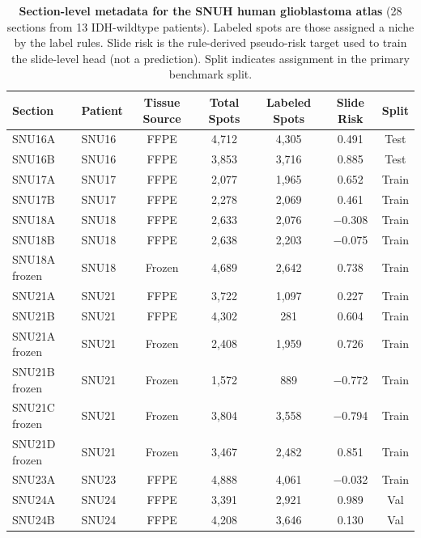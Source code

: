 \documentclass[11pt,letterpaper]{article}
\begin{document}
\clearpage

\begin{table}[H]
\centering
\caption{\textbf{Section-level metadata for the SNUH human glioblastoma atlas} (28 sections from 13 IDH-wildtype patients). Labeled spots are those assigned a niche by the label rules. Slide risk is the rule-derived pseudo-risk target used to train the slide-level head (not a prediction). Split indicates assignment in the primary benchmark split.}
\label{tab:s2}
\footnotesize
\setlength{\tabcolsep}{4.5pt}
\begin{tabular}{llccccc}
\toprule
\textbf{Section} & \textbf{Patient} & \textbf{Tissue Source} & \textbf{Total Spots} & \textbf{Labeled Spots} & \textbf{Slide Risk} & \textbf{Split} \\
\midrule
SNU16A         & SNU16   & FFPE   & 4{,}712 & 4{,}305 & 0.491  & Test \\
SNU16B         & SNU16   & FFPE   & 3{,}853 & 3{,}716 & 0.885  & Test \\
SNU17A         & SNU17   & FFPE   & 2{,}077 & 1{,}965 & 0.652  & Train \\
SNU17B         & SNU17   & FFPE   & 2{,}278 & 2{,}069 & 0.461  & Train \\
SNU18A         & SNU18   & FFPE   & 2{,}633 & 2{,}076 & $-$0.308 & Train \\
SNU18B         & SNU18   & FFPE   & 2{,}638 & 2{,}203 & $-$0.075 & Train \\
SNU18A frozen  & SNU18   & Frozen & 4{,}689 & 2{,}642 & 0.738  & Train \\
SNU21A         & SNU21   & FFPE   & 3{,}722 & 1{,}097 & 0.227  & Train \\
SNU21B         & SNU21   & FFPE   & 4{,}302 & 281     & 0.604  & Train \\
SNU21A frozen  & SNU21   & Frozen & 2{,}408 & 1{,}959 & 0.726  & Train \\
SNU21B frozen  & SNU21   & Frozen & 1{,}572 & 889     & $-$0.772 & Train \\
SNU21C frozen  & SNU21   & Frozen & 3{,}804 & 3{,}558 & $-$0.794 & Train \\
SNU21D frozen  & SNU21   & Frozen & 3{,}467 & 2{,}482 & 0.851  & Train \\
SNU23A         & SNU23   & FFPE   & 4{,}888 & 4{,}061 & $-$0.032 & Train \\
SNU24A         & SNU24   & FFPE   & 3{,}391 & 2{,}921 & 0.989  & Val \\
SNU24B         & SNU24   & FFPE   & 4{,}208 & 3{,}646 & 0.130  & Val \\

\end{tabular}
\end{table}
\end{document}
